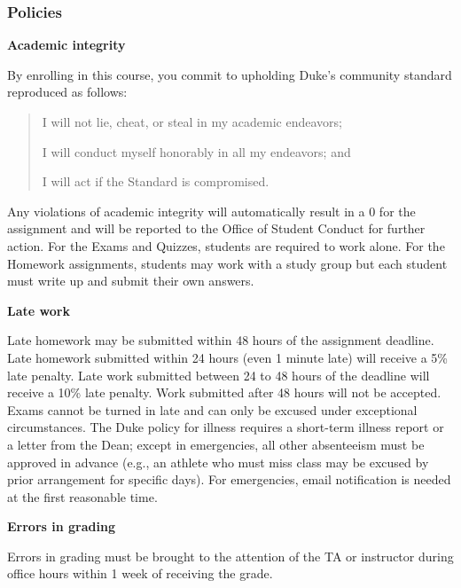 \documentclass[
  letterpaper,
  DIV=11,
  numbers=noendperiod]{scrartcl}
\begin{document}
\hypertarget{policies}{%
\subsubsection{Policies}\label{policies}}

\textbf{Academic integrity}

By enrolling in this course, you commit to upholding Duke's community
standard reproduced as follows:

\begin{quote}
I will not lie, cheat, or steal in my academic endeavors;

I will conduct myself honorably in all my endeavors; and

I will act if the Standard is compromised.
\end{quote}

Any violations of academic integrity will automatically result in a 0
for the assignment and will be reported to the Office of Student Conduct
for further action. For the Exams and Quizzes, students are required to
work alone. For the Homework assignments, students may work with a study
group but each student must write up and submit their own answers.

\newpage

\textbf{Late work}

Late homework may be submitted within 48 hours of the assignment
deadline. Late homework submitted within 24 hours (even 1 minute late)
will receive a 5\% late penalty. Late work submitted between 24 to 48
hours of the deadline will receive a 10\% late penalty. Work submitted
after 48 hours will not be accepted. Exams cannot be turned in late and
can only be excused under exceptional circumstances. The Duke policy for
illness requires a short-term illness report or a letter from the Dean;
except in emergencies, all other absenteeism must be approved in advance
(e.g., an athlete who must miss class may be excused by prior
arrangement for specific days). For emergencies, email notification is
needed at the first reasonable time.

\textbf{Errors in grading}

Errors in grading must be brought to the attention of the TA or
instructor during office hours within 1 week of receiving the grade.
\end{document}
